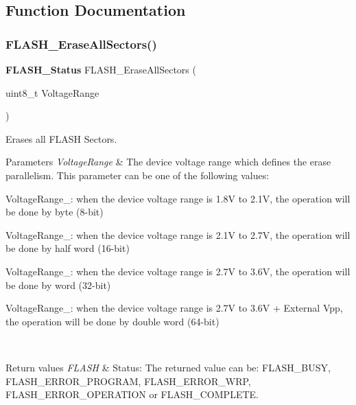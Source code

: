 \subsection{Function Documentation}
\mbox{\label{group__FLASH__Group2_ga2aee006e5f4db4280bdedd401dfa50f9}} 
\subsubsection{F\+L\+A\+S\+H\+\_\+\+Erase\+All\+Sectors()}
{\footnotesize\ttfamily \textbf{ F\+L\+A\+S\+H\+\_\+\+Status} F\+L\+A\+S\+H\+\_\+\+Erase\+All\+Sectors (\begin{DoxyParamCaption}\item[{uint8\+\_\+t}]{Voltage\+Range }\end{DoxyParamCaption})}



Erases all F\+L\+A\+SH Sectors. 


\begin{DoxyParams}{Parameters}
{\em Voltage\+Range} & The device voltage range which defines the erase parallelism. This parameter can be one of the following values\+: \begin{DoxyItemize}
\item Voltage\+Range\+\_\+: when the device voltage range is 1.\+8V to 2.\+1V, the operation will be done by byte (8-\/bit) \item Voltage\+Range\+\_\+: when the device voltage range is 2.\+1V to 2.\+7V, the operation will be done by half word (16-\/bit) \item Voltage\+Range\+\_\+: when the device voltage range is 2.\+7V to 3.\+6V, the operation will be done by word (32-\/bit) \item Voltage\+Range\+\_\+: when the device voltage range is 2.\+7V to 3.\+6V + External Vpp, the operation will be done by double word (64-\/bit)\end{DoxyItemize}
\\
\hline
\end{DoxyParams}

\begin{DoxyRetVals}{Return values}
{\em F\+L\+A\+SH} & Status\+: The returned value can be\+: F\+L\+A\+S\+H\+\_\+\+B\+U\+SY, F\+L\+A\+S\+H\+\_\+\+E\+R\+R\+O\+R\+\_\+\+P\+R\+O\+G\+R\+AM, F\+L\+A\+S\+H\+\_\+\+E\+R\+R\+O\+R\+\_\+\+W\+RP, F\+L\+A\+S\+H\+\_\+\+E\+R\+R\+O\+R\+\_\+\+O\+P\+E\+R\+A\+T\+I\+ON or F\+L\+A\+S\+H\+\_\+\+C\+O\+M\+P\+L\+E\+TE. \\
\hline
\end{DoxyRetVals}


